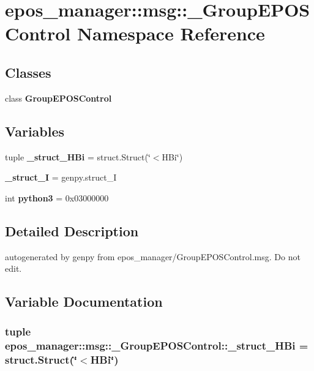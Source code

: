 \section{epos\-\_\-manager\-:\-:msg\-:\-:\-\_\-\-Group\-E\-P\-O\-S\-Control \-Namespace \-Reference}
\label{namespaceepos__manager_1_1msg_1_1__GroupEPOSControl}
\subsection*{\-Classes}
\begin{DoxyCompactItemize}
\item 
class {\bf \-Group\-E\-P\-O\-S\-Control}
\end{DoxyCompactItemize}
\subsection*{\-Variables}
\begin{DoxyCompactItemize}
\item 
tuple {\bf \-\_\-struct\-\_\-\-H\-Bi} = struct.\-Struct(\char`\"{}$<$\-H\-Bi\char`\"{})
\item 
{\bf \-\_\-struct\-\_\-\-I} = genpy.\-struct\-\_\-\-I
\item 
int {\bf python3} = 0x03000000
\end{DoxyCompactItemize}


\subsection{\-Detailed \-Description}
\begin{DoxyVerb}autogenerated by genpy from epos_manager/GroupEPOSControl.msg. Do not edit.\end{DoxyVerb}
 

\subsection{\-Variable \-Documentation}
\subsubsection[{\-\_\-struct\-\_\-\-H\-Bi}]{\setlength{\rightskip}{0pt plus 5cm}tuple {\bf epos\-\_\-manager\-::msg\-::\-\_\-\-Group\-E\-P\-O\-S\-Control\-::\-\_\-struct\-\_\-\-H\-Bi} = struct.\-Struct(\char`\"{}$<$\-H\-Bi\char`\"{})}\label{namespaceepos__manager_1_1msg_1_1__GroupEPOSControl_af789b7ec423d16bcd2c26d67be4ed2bb}


